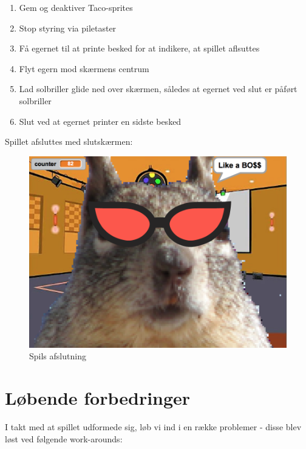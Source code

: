 \documentclass[11pt,a4paper,final]{article}
\begin{document}
\begin{enumerate}
\item{Gem og deaktiver Taco-sprites}
\item{Stop styring via piletaster}
\item{Få egernet til at printe besked for at indikere, at spillet aflsuttes}
\item{Flyt egern mod skærmens centrum}
\item{Lad solbriller glide ned over skærmen, således at egernet ved slut er påført solbriller}
\item{Slut ved at egernet printer en sidste besked}
\end{enumerate}

Spillet afsluttes med slutskærmen:

\begin{figure}[H]
\centering
\includegraphics[scale = 0.4]{FatBossSquirrel.png}
\caption{Spils afslutning}
\end{figure}

\section*{Løbende forbedringer}

I takt med at spillet udformede sig, løb vi ind i en række problemer - disse blev løst ved følgende work-arounds:
\end{document}
